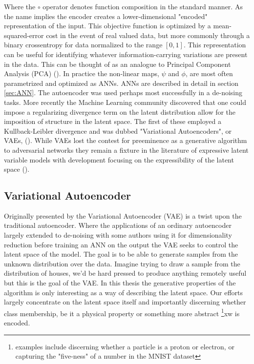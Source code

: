 \noindent  Where the $\circ$ operator denotes function composition in the standard manner. As the name implies the encoder creates a lower-dimensional "encoded" representation of the input. This objective function is optimized by a mean-squared-error cost in the event of real valued data, but more commonly through a binary crossentropy for data normalized to the range $[0, 1]$.
This representation can be useful for identifying whatever information-carrying variations are present in the data. This can be thought of as an analogue to Principal Component Analysis (PCA) (\cite{Marsland2009}). In practice the non-linear maps, $\psi$ and $\phi$, are most often parametrized and optimized as ANNs. ANNs are described in detail in section \ref{sec:ANN}. The autoencoder was used perhaps most successfully in a de-noising tasks. 
More recently the Machine Learning community discovered that one could impose a regularizing divergence term on the latent distribution allow for the imposition of structure in the latent space. The first of these employed a Kullback-Leibler divergence and was dubbed "Variational Autoencoders", or VAEs, (\cite{Kingma2013}). While VAEs lost the contest for preeminence as a generative algorithm to adversarial networks they remain a fixture in the literature of expressive latent variable models with development focusing on the expressibility of the latent space ().

\subsection{Variational Autoencoder}\label{sec:vae}

Originally presented by \citet{Kingma2013} the Variational Autoencoder (VAE) is a twist upon the traditional autoencoder. Where the applications of an ordinary autoencoder largely extended to de-noising with some authors using it for dimensionality reduction before training an ANN on the output the VAE seeks to control the latent space of the model. The goal is to be able to generate samples from the unknown distribution over the data. Imagine trying to draw a sample from the distribution of houses, we'd be hard pressed to produce anything remotely useful but this is the goal of the VAE. In this thesis the generative properties of the algorithm is only interesting as a way of describing the latent space. Our efforts largely concentrate on the latent space itself and importantly discerning whether class membership, be it a physical property or something more abstract \footnote{examples include discerning whether a particle is  a proton or electron, or capturing the "five-ness" of a number in the MNIST dataset}xw is encoded.

